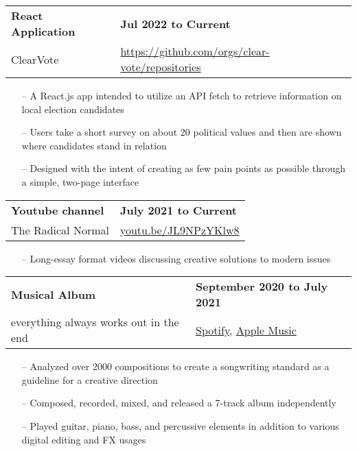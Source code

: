 \documentclass[11pt,letterpaper]{article}
\begin{document}
\begin{tabularx}{\textwidth}{lX}
    \textbf{React Application} & \hfill \textbf{Jul 2022 to Current} \\[0pt]
    \small ClearVote & \hfill \href{https://github.com/jkru3/clear-vote/}{https://github.com/orgs/clear-vote/repositories} \\
\end{tabularx}
\begin{itemize}
    \small
    \item[--] A React.js app intended to utilize an API fetch to retrieve information on local election candidates
    \item[--] Users take a short survey on about 20 political values and then are shown where candidates stand in relation
    \item[--] Designed with the intent of creating as few pain points as possible through a simple, two-page interface
\end{itemize}

\begin{tabularx}{\textwidth}{lX}
    \textbf{Youtube channel} & \hfill \textbf{July 2021 to Current} \\[0pt]
    \small The Radical Normal & \hfill \href{https://www.youtube.com/channel/UC3hpUs48maO17MxozoTlX_Q}{youtu.be/JL9NPzYKlw8} \\[0pt]
\end{tabularx}
\begin{itemize}
    \small
    \item[--] Long-essay format videos discussing creative solutions to modern issues
\end{itemize}

\begin{tabularx}{\textwidth}{lX}
    \textbf{Musical Album} & \hfill \textbf{September 2020 to July 2021} \\[0pt]
    \small
    everything always works out in the end & \hfill \href{https://open.spotify.com/artist/3Tav1kg6iqGUSSZtpPD69X?si=gvkz7dPpTtKBffDOujQkeA}{Spotify}, \href{https://music.apple.com/us/artist/joey-laurent/1562180121}{Apple Music} \\
\end{tabularx}
\begin{itemize}
    \small
    \item[--] Analyzed over 2000 compositions to create a songwriting standard as a guideline for a creative direction
    \item[--] Composed, recorded, mixed, and released a 7-track album independently
    \item[--] Played guitar, piano, bass, and percussive elements in addition to various digital editing and FX usages 
\end{itemize}
\end{document}
